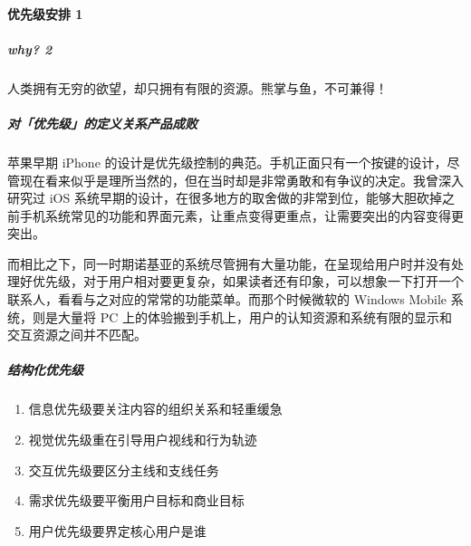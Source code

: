 \documentclass[letterpaper,11pt,english]{sphinxmanual}
\begin{document}
\paragraph{优先级安排 1\sphinxfootnotemark[468]}
\label{\detokenize{chapter_knowledge/need_analysis:id6}}%
\begin{footnotetext}[468]\sphinxAtStartFootnote
{}
%
\end{footnotetext}\ignorespaces 

\subparagraph{why? 2\sphinxfootnotemark[469]}
\label{\detokenize{chapter_knowledge/need_analysis:why-2}}%
\begin{footnotetext}[469]\sphinxAtStartFootnote
{}
%
\end{footnotetext}\ignorespaces 
人类拥有无穷的欲望，却只拥有有限的资源。熊掌与鱼，不可兼得！


\subparagraph{对「优先级」的定义关系产品成败}
\label{\detokenize{chapter_knowledge/need_analysis:id7}}
苹果早期 iPhone
的设计是优先级控制的典范。手机正面只有一个按键的设计，尽管现在看来似乎是理所当然的，但在当时却是非常勇敢和有争议的决定。我曾深入研究过
iOS
系统早期的设计，在很多地方的取舍做的非常到位，能够大胆砍掉之前手机系统常见的功能和界面元素，让重点变得更重点，让需要突出的内容变得更突出。

而相比之下，同一时期诺基亚的系统尽管拥有大量功能，在呈现给用户时并没有处理好优先级，对于用户相对要更复杂，如果读者还有印象，可以想象一下打开一个联系人，看看与之对应的常常的功能菜单。而那个时候微软的
Windows Mobile 系统，则是大量将 PC
上的体验搬到手机上，用户的认知资源和系统有限的显示和交互资源之间并不匹配。


\subparagraph{结构化优先级}
\label{\detokenize{chapter_knowledge/need_analysis:id8}}\begin{enumerate}
%
\item {} 
信息优先级要关注内容的组织关系和轻重缓急

\item {} 
视觉优先级重在引导用户视线和行为轨迹

\item {} 
交互优先级要区分主线和支线任务

\item {} 
需求优先级要平衡用户目标和商业目标

\item {} 
用户优先级要界定核心用户是谁

\end{enumerate}
\end{document}
